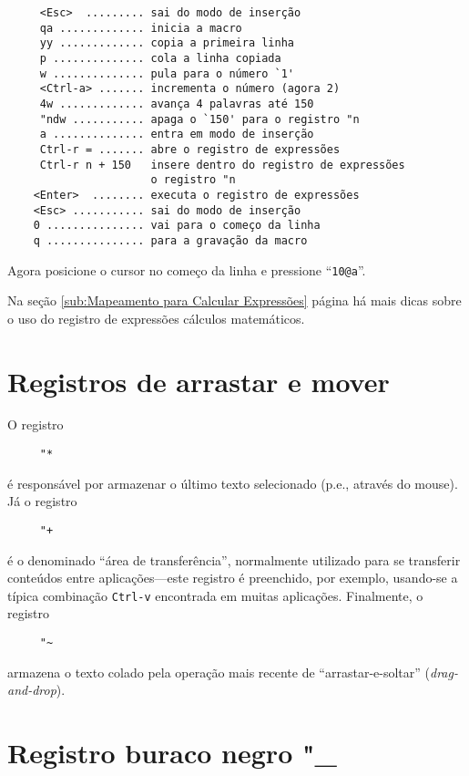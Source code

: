 \begin{verbatim}
     <Esc>  ......... sai do modo de inserção
     qa ............. inicia a macro
     yy ............. copia a primeira linha
     p .............. cola a linha copiada
     w .............. pula para o número `1'
     <Ctrl-a> ....... incrementa o número (agora 2)
     4w ............. avança 4 palavras até 150
     "ndw ........... apaga o `150' para o registro "n
     a .............. entra em modo de inserção
     Ctrl-r = ....... abre o registro de expressões
     Ctrl-r n + 150   insere dentro do registro de expressões
                      o registro "n
    <Enter>  ........ executa o registro de expressões
    <Esc> ........... sai do modo de inserção
    0 ............... vai para o começo da linha
    q ............... para a gravação da macro
\end{verbatim}

Agora posicione o cursor no começo da linha e pressione ``\verb|10@a|''.


{\Large {}} Na seção \ref{sub:Mapeamento para Calcular Expressões} página
\pageref{sub:Mapeamento para Calcular Expressões} há mais dicas sobre o uso do
registro de expressões cálculos matemáticos.

\section{Registros de arrastar e mover}
\label{Registros de arrastar e mover}

O registro 
\begin{verbatim}
     "*
\end{verbatim}
 é responsável por armazenar o último texto selecionado (p.e., através do
mouse). Já o registro 
\begin{verbatim}
     "+
\end{verbatim}
é o denominado ``área de transferência'', normalmente utilizado para se
transferir conteúdos entre aplicações---este registro é preenchido, por
exemplo, usando-se a típica combinação {\tt Ctrl-v} encontrada em muitas
aplicações. Finalmente, o registro 
\begin{verbatim}
     "~
\end{verbatim}
armazena o texto colado pela operação mais recente de ``arrastar-e-soltar''
({\em drag-and-drop}). 

\section{Registro buraco negro "\_}
\label{Registro buraco negro}

